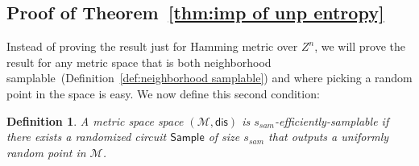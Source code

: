 \documentclass[11pt]{article}
\newcommand{\thref}[1]{\mbox{Theorem~\ref{#1}}}
\newcommand{\defref}[1]{\mbox{Definition~\ref{#1}}}
\newcommand{\class}[1]{{\ensuremath{\mathsf{#1}}}}
\newcommand{\sample}{\ensuremath{\class{Sample}}\xspace}
\newcommand{\dis}{\ensuremath{\mathsf{dis}}}
\newtheorem{definition}[theorem]{Definition}
\begin{document}
\subsection{Proof of \thref{thm:imp of unp entropy}}
\label{sec:proof of imp unp entropy}
Instead of proving the result just for Hamming metric over $Z^n$, we will prove the result for any metric space that is both neighborhood samplable~(\defref{def:neighborhood samplable}) and where picking a random point in the space is easy.  We now define this second condition:
\begin{definition}
A metric space space $(\mathcal{M}, \dis)$ is $s_{sam}$-\emph{efficiently-samplable} if there exists a randomized circuit $\sample$ of size $s_{sam}$ that outputs a uniformly random point in $\mathcal{M}$.
\end{definition}
\end{document}
